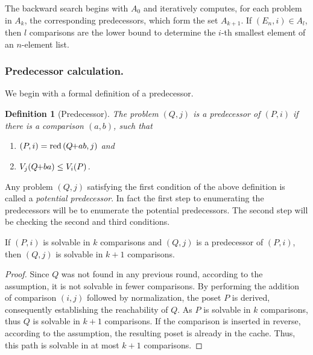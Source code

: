 \documentclass[twoside,leqno,twocolumn]{article}
\newcommand{\pchild}[3]{{#1}\kern-1pt{+}{#2}{#3}}
\newcommand{\reduced}[1]{\operatorname{red}{#1}}
\newtheorem{definition}{Definition}[section]
\begin{document}
The backward search begins with $A_0$ and iteratively computes, for each problem in $A_k$, the corresponding predecessors, which form the set $A_{k + 1}$.
If $(E_n, i) \in A_l$, then $l$ comparisons are the lower bound to determine the $i$-th smallest element of an $n$-element list.


\subsubsection{Predecessor calculation.} \label{sec:backward:predecessor_calculation}
We begin with a formal definition of a predecessor.

\begin{definition}[Predecessor] \label{definition:predecessor_calculation}
  The problem $(Q, j)$ is a \emph{predecessor} of $(P, i)$ if there is a comparison $(a, b)$, such that
  \begin{enumerate}
    \item $(P, i) = \reduced(\pchild{Q}{a}{b}, j)$ and
    \item $V_j(\pchild{Q}{b}{a}) \le V_i(P)$.
  \end{enumerate}
\end{definition}

Any problem $(Q, j)$ satisfying the first condition of the above definition is called a \emph{potential predecessor}.
In fact the first step to enumerating the predecessors will be to enumerate the potential predecessors.
The second step will be checking the second and third conditions.

\begin{lemma} \label{lemma:predecessor_calculation}
  If $(P, i)$ is solvable in $k$ comparisons and $(Q, j)$ is a predecessor of $(P, i)$, then $(Q, j)$ is solvable in $k + 1$ comparisons.
\end{lemma}

\begin{proof} \label{proof:predecessor_calculation}
  Since $Q$ was not found in any previous round, according to the assumption, it is not solvable in fewer comparisons.
  By performing the addition of comparison $(i, j)$ followed by normalization, the poset $P$ is derived, consequently establishing the reachability of $Q$.
  As $P$ is solvable in $k$ comparisons, thus $Q$ is solvable in $k + 1$ comparisons.
  If the comparison is inserted in reverse, according to the assumption, the resulting poset is already in the cache.
  Thus, this path is solvable in at most $k + 1$ comparisons.
\end{proof}
\end{document}
